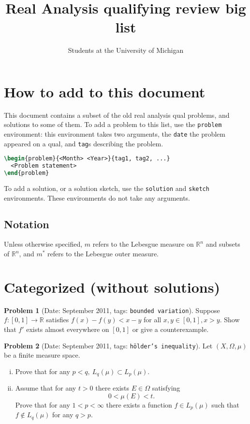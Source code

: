 \documentclass[11pt, notitlepage]{article}
\title{Real Analysis qualifying review big list}
\author{Students at the University of Michigan}
\theoremstyle{definition}
\theoremstyle{definition}
\theoremstyle{definition}
\newtheorem{probstate}{Problem}
\theoremstyle{remark}
\newenvironment{problem}[2]{
    \begin{probstate}[Date: #1, tags: \texttt{#2}]
}
{
  \end{probstate}
}
\newcommand{\R}{\mathbb{R}}
\begin{document}
\maketitle


\section*{How to add to this document}
This document contains a subset of the old real analysis qual problems, and solutions to some of them.
To add a problem to this list, use the \texttt{problem} environment: this environment takes two arguments, the \texttt{date} the problem appeared on a qual, and \texttt{tag}s describing the problem.
\begin{lstlisting}[language=TeX]
\begin{problem}{<Month> <Year>}{tag1, tag2, ...}
  <Problem statement>
\end{problem}
\end{lstlisting}

To add a solution, or a solution sketch, use the \texttt{solution} and \texttt{sketch} environments.
These environments do not take any arguments.

\subsection*{Notation}
Unless otherwise specified, $m$ refers to the Lebesgue measure on $\mathbb{R}^n$ and subsets of $\mathbb{R}^n$, and $m^{\ast}$ refers to the Lebesgue outer measure.

\section{Categorized (without solutions)}


\begin{problem}{September 2011}{bounded variation}
  Suppose $f:[0,1] \to \R$ satisfies $f(x)-f(y)<x-y$ for all $x,y\in [0,1], x>y$.
  Show that $f'$ exists almost everywhere on $[0,1]$ or give a counterexample.
\end{problem}

\begin{problem}{September 2011}{hölder's inequality}
  Let $(X,\Omega, \mu)$ be a finite measure space.
 \begin{enumerate}[(i)]
   \item Prove that for any $p<q, \ L_q(\mu) \subset L_p(\mu)$.
   \item Assume that for any
 $t>0$ there exists $E \in \Omega$ satisfying
 \[
  0< \mu(E) <t.
 \]
 Prove that for any $1<p< \infty$ there exists a function $f \in
 L_p(\mu)$ such that $f \notin L_q(\mu)$ for any $q>p$.
\end{enumerate}
\end{problem}
\end{document}
